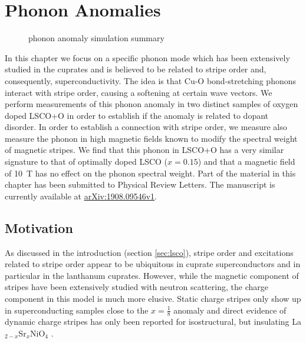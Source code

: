 \newcommand{\LSCO}{La$_{2-x}$Sr$_{x}$CuO$_4$}
\newcommand{\LSCOOsix}{La$_{1.94}$Sr$_{0.06}$CuO$_{4.035}$}
\newcommand{\LSCOO}{La$_{2-x}$Sr$_{x}$CuO$_{4+\delta}$}
\newcommand{\LCOO}{La$_2$CuO$_{4+\delta}$}
\newcommand{\LNSCO}{La$_{1.48}$Nd$_{0.4}$Sr$_{0.12}$CuO$_4$}
\newcommand{\LSCOTwenty}{La$_{1.80}$Sr$_{0.20}$CuO$_4$}
\newcommand{\LSCOopt}{La$_{1.85}$Sr$_{0.15}$CuO$_4$}
\newcommand{\LSCOseven}{La$_{1.93}$Sr$_{0.07}$CuO$_4$}
\newcommand{\LSCOTwentyfive}{La$_{1.75}$Sr$_{0.25}$CuO$_4$}
\newcommand{\HBCOO}{HgBa$_2$CuO$_{4+\delta}$}
\newcommand{\LBCO}{La$_{2-x}$Ba$_x$CuO$_4$}
\newcommand{\LBCOtwelve}{La$_{1.875}$Ba$_{0.125}$CuO$_4$}
\newcommand{\LCO}{La$_2$CuO$_4$}
\newcommand{\Tc}{$T_\text{c}$}

\chapter{Phonon Anomalies}\label{ch:anomaly}

\begin{figure}
    \centering
    \caption{phonon anomaly simulation summary}
    \label{fig:phonon_anomaly_simulation_summary}
\end{figure}

In this chapter we focus on a specific phonon mode which has been extensively studied in the cuprates and is believed to be related to stripe order and, consequently, superconductivity. The idea is that Cu-O bond-stretching phonons interact with stripe order, causing a softening at certain wave vectors. We perform measurements of this phonon anomaly in two distinct samples of oxygen doped LSCO+O in order to establish if the anomaly is related to dopant disorder. In order to establish a connection with stripe order, we measure also measure the  phonon in high magnetic fields known to modify the spectral weight of magnetic stripes. We find that this phonon in LSCO+O has a very similar signature to that of optimally doped LSCO ($x=0.15$) and that a magnetic field of \SI{10}{\tesla} has no effect on the phonon spectral weight. Part of the material in this chapter has been submitted to Physical Review Letters. The manuscript is currently available at \href{https://arxiv.org/abs/1908.09546v1}{arXiv:1908.09546v1}.

\section{Motivation}
As discussed in the introduction (section \ref{sec:lsco}), stripe order and excitations related to stripe order appear to be ubiquitous in cuprate superconductors and in particular in the lanthanum cuprates. However, while the magnetic component of stripes have been extensively studied with neutron scattering, the charge component in this model is much more elusive. Static charge stripes only show up in superconducting samples close to the $x=\frac{1}{8}$ anomaly \cite{Tranquada1995, Tranquada1996, Christensen2014, Thampy2014, Croft2014} and direct evidence of dynamic charge stripes has only been reported for isostructural, but insulating La$_{2-x}$Sr$_x$NiO$_4$ \cite{Anissimova2014}.


